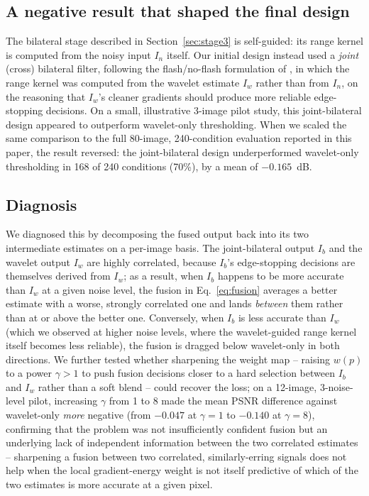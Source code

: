 \documentclass[final,3p,times,twocolumn,nopreprintline]{elsarticle}
\begin{document}
\subsection{A negative result that shaped the final design}
The bilateral stage described in Section~\ref{sec:stage3} is self-guided: its range kernel is computed from the noisy input $I_n$ itself. Our initial design instead used a \emph{joint} (cross) bilateral filter, following the flash/no-flash formulation of \cite{petschnigg2004digital}, in which the range kernel was computed from the wavelet estimate $I_w$ rather than from $I_n$, on the reasoning that $I_w$'s cleaner gradients should produce more reliable edge-stopping decisions. On a small, illustrative 3-image pilot study, this joint-bilateral design appeared to outperform wavelet-only thresholding. When we scaled the same comparison to the full 80-image, 240-condition evaluation reported in this paper, the result reversed: the joint-bilateral design underperformed wavelet-only thresholding in 168 of 240 conditions (70\%), by a mean of $-0.165$~dB.

\subsection{Diagnosis}
We diagnosed this by decomposing the fused output back into its two intermediate estimates on a per-image basis. The joint-bilateral output $I_b$ and the wavelet output $I_w$ are highly correlated, because $I_b$'s edge-stopping decisions are themselves derived from $I_w$; as a result, when $I_b$ happens to be more accurate than $I_w$ at a given noise level, the fusion in Eq.~\eqref{eq:fusion} averages a better estimate with a worse, strongly correlated one and lands \emph{between} them rather than at or above the better one. Conversely, when $I_b$ is less accurate than $I_w$ (which we observed at higher noise levels, where the wavelet-guided range kernel itself becomes less reliable), the fusion is dragged below wavelet-only in both directions. We further tested whether sharpening the weight map -- raising $w(p)$ to a power $\gamma>1$ to push fusion decisions closer to a hard selection between $I_b$ and $I_w$ rather than a soft blend -- could recover the loss; on a 12-image, 3-noise-level pilot, increasing $\gamma$ from 1 to 8 made the mean PSNR difference against wavelet-only \emph{more} negative (from $-0.047$ at $\gamma=1$ to $-0.140$ at $\gamma=8$), confirming that the problem was not insufficiently confident fusion but an underlying lack of independent information between the two correlated estimates -- sharpening a fusion between two correlated, similarly-erring signals does not help when the local gradient-energy weight is not itself predictive of which of the two estimates is more accurate at a given pixel.
\end{document}
